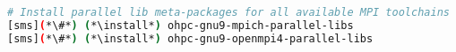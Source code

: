 
\begin{lstlisting}[language=bash,keywords={},upquote=true,keepspaces]
# Install parallel lib meta-packages for all available MPI toolchains
[sms](*\#*) (*\install*) ohpc-gnu9-mpich-parallel-libs
[sms](*\#*) (*\install*) ohpc-gnu9-openmpi4-parallel-libs
\end{lstlisting}

